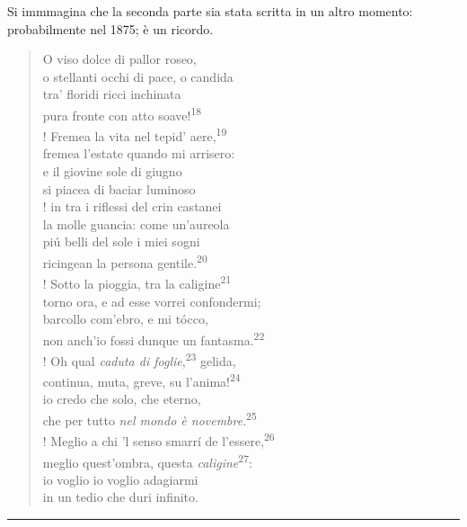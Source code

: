\documentclass{book}
\newcounter{mar}
\newcommand{\finepoesia}{\vspace*{1em}\hrule\vspace*{1em}}
\begin{document}
Si immmagina che la seconda parte sia stata scritta in un altro momento: probabilmente nel 1875; è un ricordo.

\begin{verse}
O viso dolce di pallor roseo,\\
o stellanti occhi di pace, o candida\\
tra’ floridi ricci inchinata\\
pura fronte con atto soave!\textsuperscript{18}\\!
Fremea la vita nel tepid’ aere,\textsuperscript{19}\\
fremea l’estate quando mi arrisero:\\
e il giovine sole di giugno\\
si piacea di baciar luminoso\\!
in tra i riflessi del crin castanei\\
la molle guancia: come un’aureola\\
piú belli del sole i miei sogni\\
ricingean la persona gentile.\textsuperscript{20}\\!
Sotto la pioggia, tra la caligine\textsuperscript{21}\\
torno ora, e ad esse vorrei confondermi;\\
barcollo com’ebro, e mi tócco,\\
non anch’io fossi dunque un fantasma.\textsuperscript{22}\\!
Oh qual \textit{caduta di foglie},\textsuperscript{23} gelida,\\
continua, muta, greve, su l’anima!\textsuperscript{24}\\
io credo che solo, che eterno,\\
che per tutto \textit{nel mondo è novembre}.\textsuperscript{25}\\!
Meglio a chi ’l senso smarrí de l’essere,\textsuperscript{26}\\
meglio quest’ombra, questa \textit{caligine}\textsuperscript{27}:\\
io voglio io voglio adagiarmi\\
in un tedio che duri infinito.\\
\end{verse}

\finepoesia
\end{document}
